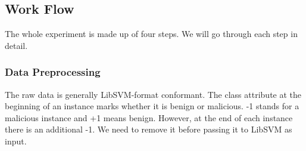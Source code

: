 \documentclass[11pt]{article}
\begin{document}





\subsection{Work Flow}
The whole experiment is made up of four steps. %
We will go through each step in detail.

\subsubsection{Data Preprocessing}
The raw data is generally LibSVM-format conformant. The class attribute at the beginning of an instance marks whether it is benign or malicious. -1 stands for a malicious instance and +1 means benign. However, at the end of each instance there is an additional -1. We need to remove it before passing it to LibSVM as input.
\end{document}
